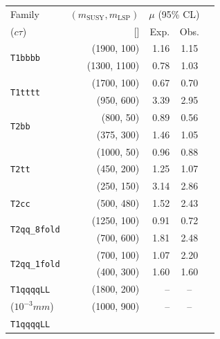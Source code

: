\clearpage
\begin{table}
  \label{tab:benchmarks_aux}
  \centering
    \begin{tabular}{ lrrcc }
      \hline
      Family
      & $(m_{\text{SUSY}}, m_{\mathrm{LSP}})$
      & \multicolumn{2}{c}{$\mu$ (95\% CL)}                                                                            \\ [0.3ex]
      ($c\tau$)
      & [\GeVns{}]
      & Exp.
      & Obs.                                                                                                           \\ [0.3ex]
      \hline
      \multirow{2}{*}{\texttt{T1bbbb}}
& (1900, 100) 
& 1.16 & 1.15 \\
& (1300, 1100)
& 0.78 & 1.03 \\ [0.5ex]
      \multirow{2}{*}{\texttt{T1tttt}}
& (1700, 100) 
& 0.67 & 0.70 \\
& (950, 600)  
& 3.39 & 2.95 \\ [0.5ex]
      \multirow{2}{*}{\texttt{T2bb}}
& (800, 50)
& 0.89 & 0.56 \\
& (375, 300)
& 1.46 & 1.05 \\ [0.5ex]
      \multirow{3}{*}{\texttt{T2tt}}
& (1000, 50)  
& 0.96 & 0.88 \\
& (450, 200)  
& 1.25 & 1.07 \\ 
& (250, 150)  
& 3.14 & 2.86 \\ [0.5ex]
      \multirow{1}{*}{\texttt{T2cc}}
& (500, 480)  
& 1.52 & 2.43 \\ [0.5ex]
      \multirow{2}{*}{\texttt{T2qq\_8fold}}
& (1250, 100) 
& 0.91 & 0.72 \\
& (700, 600)  
& 1.81 & 2.48 \\ [0.5ex]
      \multirow{2}{*}{\texttt{T2qq\_1fold}}
& (700, 100)  
& 1.07 & 2.20 \\
& (400, 300)  
& 1.60 & 1.60 \\ [0.5ex]
      \texttt{T1qqqqLL}
      & (1800, 200)
      & -- & -- \\
      ($10^{-3}\unit{mm}$)
      & (1000, 900)
      & -- & -- \\ [0.5ex]
      \texttt{T1qqqqLL}

\end{tabular}
\end{table}
